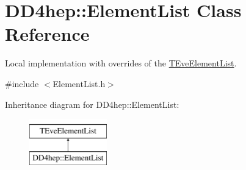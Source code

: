 \hypertarget{class_d_d4hep_1_1_element_list}{}\section{D\+D4hep\+:\+:Element\+List Class Reference}
\label{class_d_d4hep_1_1_element_list}


Local implementation with overrides of the \hyperlink{class_t_eve_element_list}{T\+Eve\+Element\+List}.  




{\ttfamily \#include $<$Element\+List.\+h$>$}

Inheritance diagram for D\+D4hep\+:\+:Element\+List\+:\begin{figure}[H]
\begin{center}
\leavevmode
\includegraphics[height=2.000000cm]{class_d_d4hep_1_1_element_list}
\end{center}
\end{figure}
